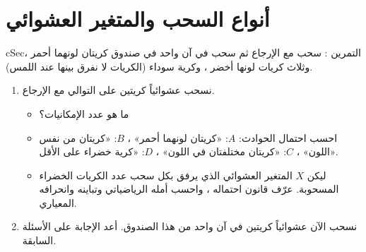 \documentclass[12pt,a4paper]{article}
\newenvironment{BOX}[2]{\begin{otherlanguage}{english}\begin{arbox}{#1}{#2}}{\end{arbox}\end{otherlanguage}}
\newcounter{exo}
\newenvironment{tamrin}[1]{\stepcounter{exo}\begin{BOX}{cSec}{التمرين \theexo: #1}}{\end{BOX}}
\newenvironment{sq}{\begin{itemize}[leftmargin=2.4em,itemsep=3pt]}{\end{itemize}}
\newcommand{\qa}{\item[(أ)]}\newcommand{\qb}{\item[(ب)]}\newcommand{\qc}{\item[(جـ)]}\newcommand{\qd}{\item[(د)]}\newcommand{\qe}{\item[(هـ)]}
\begin{document}
\section{أنواع السحب والمتغير العشوائي}
\begin{tamrin}{سحب مع الإرجاع ثم سحب في آن واحد}
في صندوق كريتان لونهما أحمر ، وثلاث كريات لونها أخضر ، وكرية سوداء (الكريات لا نفرق بينها عند اللمس).
\begin{enumerate}
\item نسحب عشوائياً كريتين على التوالي مع الإرجاع.
\begin{sq}
\qa ما هو عدد الإمكانيات؟
\qb احسب احتمال الحوادث: $A$: «كريتان لونهما أحمر» ، $B$: «كريتان من نفس اللون» ، $C$: «كريتان مختلفتان في اللون» ، $D$: «كرية خضراء على الأقل».
\qc ليكن $X$ المتغير العشوائي الذي يرفق بكل سحب عدد الكريات الخضراء المسحوبة. عرّف قانون احتماله ، واحسب أمله الرياضياتي وتباينه وانحرافه المعياري.
\end{sq}
\item نسحب الآن عشوائياً كريتين في آن واحد من هذا الصندوق. أعد الإجابة على الأسئلة السابقة.
\end{enumerate}
\end{tamrin}
\end{document}
